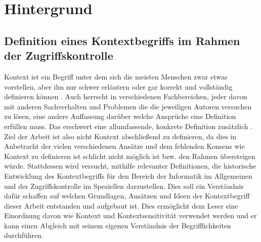 \chapter{Hintergrund}%
\label{cha:background}


\section{Definition eines Kontextbegriffs im Rahmen der Zugriffskontrolle}
Kontext ist ein Begriff unter dem sich die meisten Menschen zwar etwas vorstellen, aber ihn nur schwer erläutern oder gar korrekt und vollständig definieren können \cite{dey_understanding_2001}. Auch herrscht in verschiedenen Fachbereichen, jeder davon mit anderen Sachverhalten und Problemen die die jeweiligen Autoren versuchen zu lösen, eine andere Auffassung darüber welche Ansprüche eine Definition erfüllen muss. Das erschwert eine allumfassende, konkrete Definition zusätzlich \cite{hutchison_understanding_2005}. Ziel der Arbeit ist also nicht Kontext abschließend zu definieren, da dies in Anbetracht der vielen verschiedenen Ansätze und dem fehlenden Konsens wie Kontext zu definieren ist \cite{wei_liu_survey_2011,alegre_engineering_2016} schlicht nicht möglich ist bzw. den Rahmen übersteigen würde. Stattdessen wird versucht, mithilfe relevanter Definitionen, die historische Entwicklung des Kontextbegriffs für den Bereich der Informatik im Allgemeinen und der Zugriffskontrolle im Speziellen darzustellen. Dies soll ein Verständnis dafür schaffen auf welchen Grundlagen, Ansätzen und Ideen der Kontextbegriff dieser Arbeit entstanden und aufgebaut ist. Dies ermöglicht dem Leser eine Einordnung davon wie  Kontext und  Kontextsensitivität verwendet werden und er kann einen Abgleich mit seinem eigenen Verständnis der Begrifflichkeiten durchführen.

